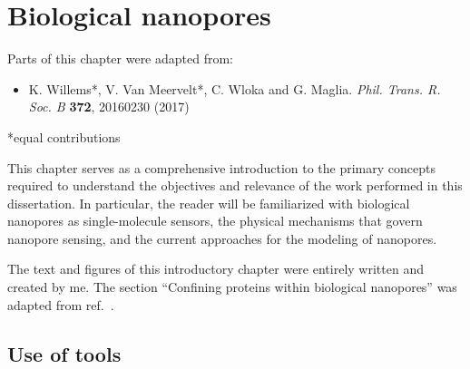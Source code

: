 \chapter{Biological nanopores}
%
\label{ch:nanopores}
%




%
%
\begin{shaded}
Parts of this chapter were adapted from:
%
\begin{itemize}
  \item K. Willems*, V. Van Meervelt*, C. Wloka and G. Maglia.
        \textit{Phil. Trans. R. Soc. B} \textbf{372}, 20160230 (2017) %
\end{itemize}
%
*equal contributions
%
\newpage
\end{shaded}
%
%

%
This chapter serves as a comprehensive introduction to the primary concepts required to understand the
objectives and relevance of the work performed in this dissertation. In particular, the reader will be
familiarized with biological nanopores as single-molecule sensors, the physical mechanisms that govern
nanopore sensing, and the current approaches for the modeling of nanopores.
%

%
The text and figures of this introductory chapter were entirely written and created by me.
%
The section
%
``Confining proteins within biological nanopores''
%
was adapted from ref.~\cite{Willems-VanMeervelt-2017}.



\clearpage

%
%
\section{Use of tools}
%

